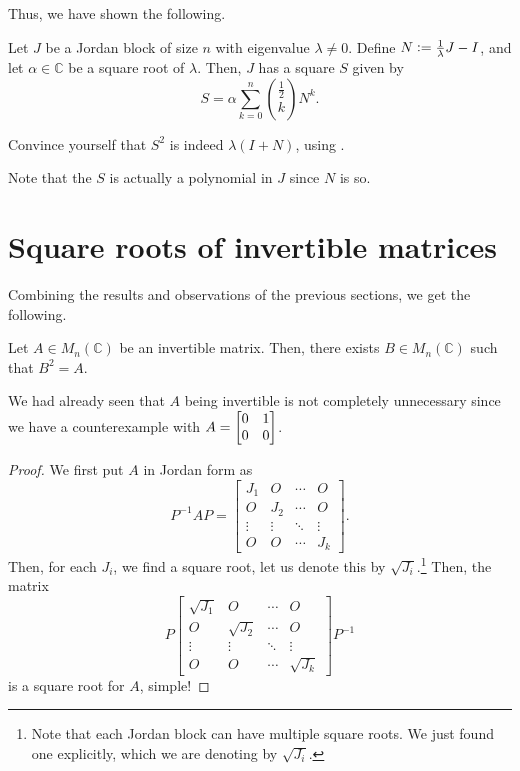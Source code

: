 \documentclass[12pt]{article}
\begin{document}
Thus, we have shown the following.
\begin{thm} \label{thm:square-root-jordan}
	Let $J$ be a Jordan block of size $n$ with eigenvalue $\lambda \neq 0$. Define $N \vcentcolon= \frac{1}{\lambda} J - I$, and let $\alpha \in \mathbb{C}$ be a square root of $\lambda$. Then, $J$ has a square $S$ given by
	\begin{equation} \label{eq:02}
		S = \alpha \sum_{k = 0}^{n} \binom{\frac{1}{2}}{k} N^{k}.
	\end{equation}
\end{thm}

\begin{exe}
	Convince yourself that $S^{2}$ is indeed $\lambda(I + N)$, using .
\end{exe}

\begin{obs} \label{obs:polynomial-jordan-root}
	Note that the $S$ is actually a polynomial in $J$ since $N$ is so.
\end{obs}

\section{Square roots of invertible matrices}

Combining the results and observations of the previous sections, we get the following.

\begin{thm}
	Let $A \in M_{n}(\mathbb{C})$ be an invertible matrix. Then, there exists $B \in M_{n}(\mathbb{C})$ such that $B^{2} = A$.
\end{thm}
We had already seen that $A$ being invertible is not completely unnecessary since we have a counterexample with $A = \begin{bmatrix} 0 & 1 \\ 0 & 0 \end{bmatrix}$.
\begin{proof} 
	We first put $A$ in Jordan form as
	\begin{equation*} 
		P^{-1} A P = 
		\begin{bmatrix}
			J_{1} & O & \cdots & O \\
			O & J_{2} & \cdots & O \\
			\vdots & \vdots & \ddots & \vdots \\
			O & O & \cdots & J_{k}
		\end{bmatrix}.
	\end{equation*}
	Then, for each $J_{i}$, we find a square root, let us denote this by $\sqrt{J_{i}}$.\footnote{Note that each Jordan block can have multiple square roots. We just found one explicitly, which we are denoting by $\sqrt{J_{i}}$.} Then, the matrix
	\begin{equation*} 
		P\begin{bmatrix}
			\sqrt{J_{1}} & O & \cdots & O \\
			O & \sqrt{J_{2}} & \cdots & O \\
			\vdots & \vdots & \ddots & \vdots \\
			O & O & \cdots & \sqrt{J_{k}}
		\end{bmatrix}P^{-1}
	\end{equation*}
	is a square root for $A$, simple!
\end{proof}
\end{document}
